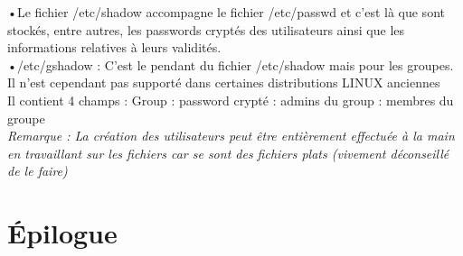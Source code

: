 \documentclass[a4paper, 11pt, french, oneside]{book}
\begin{document}
	•Le fichier {\color{blue}/etc/shadow} accompagne le fichier {\color{blue}/etc/passwd} et c’est là que sont stockés, entre autres, les passwords cryptés des utilisateurs ainsi que les informations relatives à leurs validités.\\
	
	•{\color{blue}/etc/gshadow} : C’est le pendant du fichier {\color{blue}/etc/shadow} mais pour les groupes. Il n’est cependant pas supporté dans certaines distributions LINUX anciennes\\
Il contient 4 champs : Group : password crypté : admins du group : membres du groupe\\

\textit{Remarque : La création des utilisateurs peut être entièrement effectuée à la main en travaillant sur les fichiers car se sont des fichiers plats (vivement déconseillé de le faire)}





		

	

 
   \appendix
   

	

   \backmatter
   
   \chapter{Épilogue}
\end{document}
